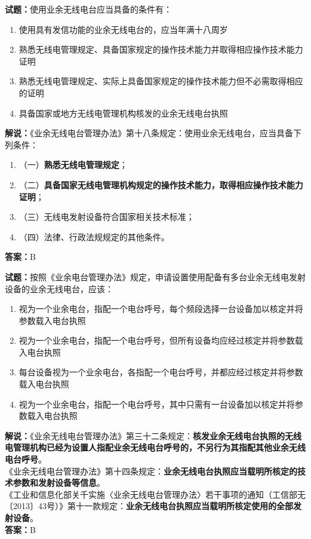 \documentclass{ctexbook}
\begin{document}
\vspace{\baselineskip}

\noindent\textbf{试题：}使用业余无线电台应当具备的条件有：
\begin{enumerate}[leftmargin=3em]
  \item 使用具有发信功能的业余无线电台的，应当年满十八周岁
  \item 熟悉无线电管理规定、具备国家规定的操作技术能力并取得相应操作技术能力证明
  \item 熟悉无线电管理规定、实际上具备国家规定的操作技术能力但不必需取得相应的证明
  \item 具备国家或地方无线电管理机构核发的业余无线电台执照
\end{enumerate}
\noindent\textbf{解说：}《业余无线电台管理办法》第十八条规定：使用业余无线电台，应当具备下列条件：
\begin{enumerate}[label=, leftmargin=0.8em]
  \item （一）\textbf{熟悉无线电管理规定}；
  \item （二）\textbf{具备国家无线电管理机构规定的操作技术能力，取得相应操作技术能力证明}；
  \item （三）无线电发射设备符合国家相关技术标准；
  \item （四）法律、行政法规规定的其他条件。
\end{enumerate}
\noindent\textbf{答案：}B

\vspace{\baselineskip}

\noindent\textbf{试题：}按照《业余电台管理办法》规定，申请设置使用配备有多台业余无线电发射设备的业余无线电台，应该：
\begin{enumerate}[leftmargin=3em]
  \item 视为一个业余电台，指配一个电台呼号，每个频段选择一台设备加以核定并将参数载入电台执照
  \item 视为一个业余电台，指配一个电台呼号，但所有设备均应经过核定并将参数载入电台执照
  \item 每台设备视为一个业余电台，各指配一个电台呼号，并都应经过核定并将参数载入电台执照
  \item 视为一个业余电台，指配一个电台呼号，其中只需有一台设备加以核定并将参数载入电台执照
\end{enumerate}
\noindent\textbf{解说：}《业余无线电台管理办法》第三十二条规定：\textbf{核发业余无线电台执照的无线电管理机构已经为设置人指配业余无线电台呼号的，不另行为其指配其他业余无线电台呼号}。\\
《业余无线电台管理办法》第十四条规定：\textbf{业余无线电台执照应当载明所核定的技术参数和发射设备等信息}。\\
《工业和信息化部关千实施〈业余无线电台管理办法〉若干事项的通知（工信部无〔2013〕43号）》第十一款规定：\textbf{业余无线电台执照应当载明所核定使用的全部发射设备}。\\\noindent\textbf{答案：}B
\end{document}
